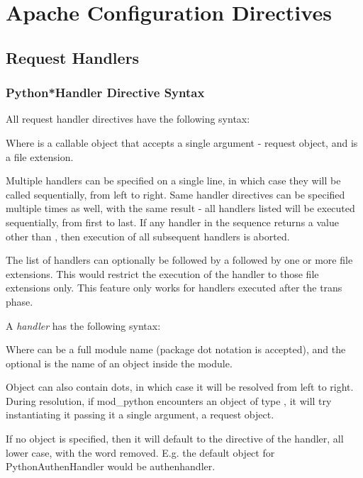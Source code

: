 \chapter{Apache Configuration Directives\label{directives}}

\section{Request Handlers\label{dir-handlers}}

\subsection{Python*Handler Directive Syntax\label{dir-handlers-syn}}

All request handler directives have the following syntax: 


Where  is a callable object that accepts a single
argument - request object, and  is a file extension.

Multiple handlers can be specified on a single line, in which case
they will be called sequentially, from left to right. Same handler
directives can be specified multiple times as well, with the same
result - all handlers listed will be executed sequentially, from first
to last. If any handler in the sequence returns a value other than
, then execution of all subsequent handlers is aborted.

The list of handlers can optionally be followed by a \code{|} followed
by one or more file extensions. This would restrict the execution of
the handler to those file extensions only. This feature only works for
handlers executed after the trans phase.

A \emph{handler} has the following syntax: 


Where  can be a full module name (package dot notation is
accepted), and the optional  is the name of an object
inside the module.

Object can also contain dots, in which case it will be resolved from
left to right. During resolution, if mod_python encounters an object
of type , it will try instantiating it passing it a single
argument, a request object.

If no object is specified, then it will default to the directive of
the handler, all lower case, with the word 
removed. E.g. the default object for PythonAuthenHandler would be
authenhandler.

